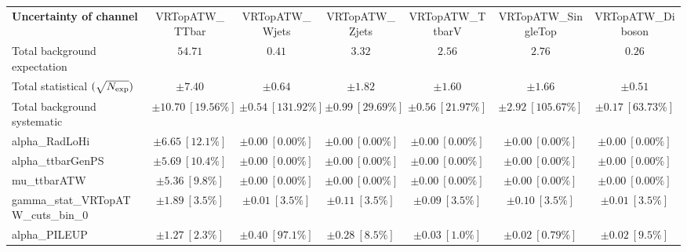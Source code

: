 
\begin{sidewaystable}
\begin{center}
\setlength{\tabcolsep}{0.0pc}
\begin{tabular*}{\textwidth}{@{\extracolsep{\fill}}lcccccc}
\noalign{\smallskip}\hline\noalign{\smallskip}
{\bf Uncertainty of channel}                                    & VRTopATW\_TTbar            & VRTopATW\_Wjets            & VRTopATW\_Zjets            & VRTopATW\_TtbarV            & VRTopATW\_SingleTop            & VRTopATW\_Diboson            \\
\noalign{\smallskip}\hline\noalign{\smallskip}
Total background expectation             &  $54.71$        &  $0.41$        &  $3.32$        &  $2.56$        &  $2.76$        &  $0.26$       \\
\noalign{\smallskip}\hline\noalign{\smallskip}
Total statistical $(\sqrt{N_{\rm exp}})$              & $\pm 7.40$        & $\pm 0.64$        & $\pm 1.82$        & $\pm 1.60$        & $\pm 1.66$        & $\pm 0.51$       \\
Total background systematic               & $\pm 10.70\ [19.56\%] $        & $\pm 0.54\ [131.92\%] $        & $\pm 0.99\ [29.69\%] $        & $\pm 0.56\ [21.97\%] $        & $\pm 2.92\ [105.67\%] $        & $\pm 0.17\ [63.73\%] $             \\
\noalign{\smallskip}\hline\noalign{\smallskip}
\noalign{\smallskip}\hline\noalign{\smallskip}
alpha\_RadLoHi         & $\pm 6.65\ [12.1\%] $          & $\pm 0.00\ [0.00\%] $          & $\pm 0.00\ [0.00\%] $          & $\pm 0.00\ [0.00\%] $          & $\pm 0.00\ [0.00\%] $          & $\pm 0.00\ [0.00\%] $       \\
alpha\_ttbarGenPS         & $\pm 5.69\ [10.4\%] $          & $\pm 0.00\ [0.00\%] $          & $\pm 0.00\ [0.00\%] $          & $\pm 0.00\ [0.00\%] $          & $\pm 0.00\ [0.00\%] $          & $\pm 0.00\ [0.00\%] $       \\
mu\_ttbarATW         & $\pm 5.36\ [9.8\%] $          & $\pm 0.00\ [0.00\%] $          & $\pm 0.00\ [0.00\%] $          & $\pm 0.00\ [0.00\%] $          & $\pm 0.00\ [0.00\%] $          & $\pm 0.00\ [0.00\%] $       \\
gamma\_stat\_VRTopATW\_cuts\_bin\_0         & $\pm 1.89\ [3.5\%] $          & $\pm 0.01\ [3.5\%] $          & $\pm 0.11\ [3.5\%] $          & $\pm 0.09\ [3.5\%] $          & $\pm 0.10\ [3.5\%] $          & $\pm 0.01\ [3.5\%] $       \\
alpha\_PILEUP         & $\pm 1.27\ [2.3\%] $          & $\pm 0.40\ [97.1\%] $          & $\pm 0.28\ [8.5\%] $          & $\pm 0.03\ [1.0\%] $          & $\pm 0.02\ [0.79\%] $          & $\pm 0.02\ [9.5\%] $       \\

\end{tabular*}
\end{center}
\end{sidewaystable}
